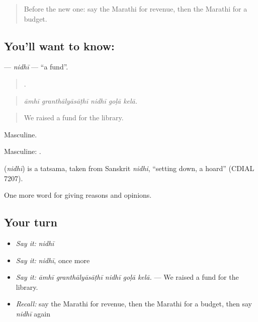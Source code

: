 \label{lesson:MR-C361-nidhi}



\begin{quote}
Before the new one: say the Marathi for revenue, then the Marathi for a budget.
\end{quote}

\subsection*{You'll want to know: }
\textbf{} — \emph{nidhī} — \textquotedblleft{}a fund\textquotedblright{}.

\begin{quote}
    .
\end{quote}

\begin{quote}
\emph{āmhī granthālyāsāṭhī nidhī goḷā kelā.}
\end{quote}

\begin{quote}
We raised a fund for the library.
\end{quote}

Masculine.

Masculine:  .

\begin{cousinweb}
\textbf{} (\emph{nidhī}) is a tatsama, taken from Sanskrit \emph{nidhi}, \textquotedblleft{}setting down, a hoard\textquotedblright{} (CDIAL 7207).
\end{cousinweb}

\begin{grammarlens}[title={What you've built}]
One more word for giving reasons and opinions.
\end{grammarlens}

\subsection*{Your turn}
\begin{itemize}
\raggedright
  \item \emph{Say it:} \emph{nidhī}
  \item \emph{Say it:} \emph{nidhī}, once more
  \item \emph{Say it:} \emph{āmhī granthālyāsāṭhī nidhī goḷā kelā.} — We raised a fund for the library.
  \item \emph{Recall:} say the Marathi for revenue, then the Marathi for a budget, then say \emph{nidhī} again
\end{itemize}


